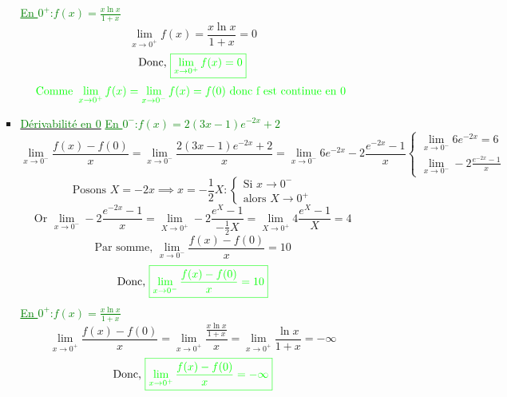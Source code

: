 \documentclass[12pt]{article}
\begin{document}
\begin{itemize}
\begin{itemize}
\begin{itemize}
        		 \textcolor{green}{\underline{En $0^{+}$}:$f(x)=\frac{x\ln x}{1 + x}$}
        		\[\lim_{x \to 0^{+}}f(x)=\frac{x\ln x}{1 + x}=0\]
        		\[\text{Donc, }\color{green}{\boxed{\lim_{x \to 0^{+}}f(x)=0}}\]
        	\[\textcolor{green}{\text{Comme }\lim_{x \to 0^{+}}f(x)=\lim_{x \to 0^{-}}f(x)=f(0)\text{ donc f est continue en 0 }}\]
        	\item \underline{\textcolor{green}{Dérivabilité en 0}}
        	\textcolor{green}{\underline{En $0^{-}$}:$f(x)=2(3x - 1)e^{-2x} + 2$}
        	\[
        	\lim_{x \to 0^{-}}\frac{f(x)-f(0)}{x}=\lim_{x \to 0^{-}}\frac{2(3x - 1)e^{-2x} + 2}{x}=
        	\lim_{x \to 0^{-}}6e^{-2x}-2\frac{e^{-2x}-1}{x} 
        	\begin{cases}
        	\lim_{x \to 0^{-}}6e^{-2x}=6\\
        	\lim_{x \to 0^{-}}-2\frac{e^{-2x}-1}{x}  
        	\end{cases}
        	\]
        	\[
        	\text{Posons }X=-2x \implies x=-\frac{1}{2}X:
        	\begin{cases}
        	\text{Si } {x \to 0^{-}}\\
        	\text{alors } {X \to 0^{+}}
        	\end{cases}
        	\]
        	\[\text{Or }\lim_{x \to 0^{-}}-2\frac{e^{-2x}-1}{x}=\lim_{X \to 0^{+}}-2\frac{e^{X}-1}{-\frac{1}{2}X}=\lim_{X \to 0^{+}}4\frac{e^{X}-1}{X}=4\]
        	\[\text{Par somme, }\lim_{x \to 0^{-}}\frac{f(x)-f(0)}{x}=10\]
        	\[\text{Donc, }\color{green}{\boxed{\lim_{x \to 0^{-}}\frac{f(x)-f(0)}{x}=10}}\]
        	\textcolor{green}{\underline{En $0^{+}$}:$f(x)=\frac{x\ln x}{1+x}$}
        	\[
        	\lim_{x \to 0^{+}}\frac{f(x)-f(0)}{x}=\lim_{x \to 0^{+}}\frac{\frac{x\ln x}{1+x}}{x}=
        	\lim_{x \to 0^{+}}\frac{\ln x}{1+x}=-\infty
        	\]
        	\[\text{Donc, }\color{green}{\boxed{\lim_{x \to 0^{+}}\frac{f(x)-f(0)}{x}=-\infty}}\]
        \end{itemize}

\end{itemize}
\end{itemize}
\end{document}
